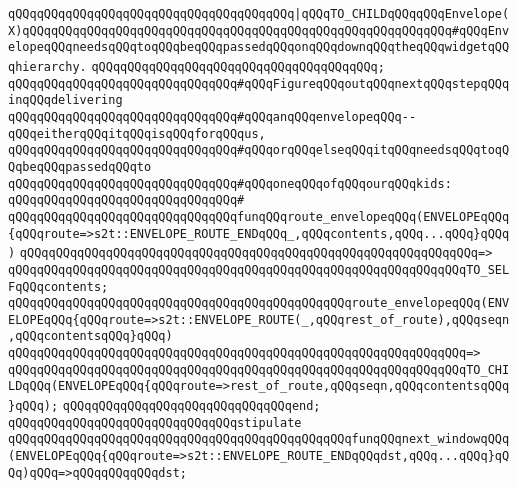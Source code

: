 \verb|qQQqqQQqqQQqqQQqqQQqqQQqqQQqqQQqqQQqqQQq|\verb#|qQQqTO_CHILDqQQqqQQqEnvelope(X)qQQqqQQqqQQqqQQqqQQqqQQqqQQqqQQqqQQqqQQqqQQqqQQqqQQqqQQqqQQq#\verb|#qQQqEnvelopeqQQqneedsqQQqtoqQQqbeqQQqpassedqQQqonqQQqdownqQQqtheqQQqwidgetqQQqhierarchy.|\newline
\verb|qQQqqQQqqQQqqQQqqQQqqQQqqQQqqQQqqQQqqQQq;|\newline
\newline
\verb|qQQqqQQqqQQqqQQqqQQqqQQqqQQqqQQq#qQQqFigureqQQqoutqQQqnextqQQqstepqQQqinqQQqdelivering|\newline
\verb|qQQqqQQqqQQqqQQqqQQqqQQqqQQqqQQq#qQQqanqQQqenvelopeqQQq--qQQqeitherqQQqitqQQqisqQQqforqQQqus,|\newline
\verb|qQQqqQQqqQQqqQQqqQQqqQQqqQQqqQQq#qQQqorqQQqelseqQQqitqQQqneedsqQQqtoqQQqbeqQQqpassedqQQqto|\newline
\verb|qQQqqQQqqQQqqQQqqQQqqQQqqQQqqQQq#qQQqoneqQQqofqQQqourqQQqkids:|\newline
\verb|qQQqqQQqqQQqqQQqqQQqqQQqqQQqqQQq#|\newline
\verb|qQQqqQQqqQQqqQQqqQQqqQQqqQQqqQQqfunqQQqroute_envelopeqQQq(ENVELOPEqQQq{qQQqroute=>s2t::ENVELOPE_ROUTE_ENDqQQq_,qQQqcontents,qQQq...qQQq}qQQq)|\newline
\verb|qQQqqQQqqQQqqQQqqQQqqQQqqQQqqQQqqQQqqQQqqQQqqQQqqQQqqQQqqQQqqQQq=>|\newline
\verb|qQQqqQQqqQQqqQQqqQQqqQQqqQQqqQQqqQQqqQQqqQQqqQQqqQQqqQQqqQQqqQQqTO_SELFqQQqcontents;|\newline
\newline
\verb|qQQqqQQqqQQqqQQqqQQqqQQqqQQqqQQqqQQqqQQqqQQqqQQqroute_envelopeqQQq(ENVELOPEqQQq{qQQqroute=>s2t::ENVELOPE_ROUTE(_,qQQqrest_of_route),qQQqseqn,qQQqcontentsqQQq}qQQq)|\newline
\verb|qQQqqQQqqQQqqQQqqQQqqQQqqQQqqQQqqQQqqQQqqQQqqQQqqQQqqQQqqQQqqQQq=>|\newline
\verb|qQQqqQQqqQQqqQQqqQQqqQQqqQQqqQQqqQQqqQQqqQQqqQQqqQQqqQQqqQQqqQQqTO_CHILDqQQq(ENVELOPEqQQq{qQQqroute=>rest_of_route,qQQqseqn,qQQqcontentsqQQq}qQQq);|\newline
\verb|qQQqqQQqqQQqqQQqqQQqqQQqqQQqqQQqend;|\newline
\newline
\newline
\verb|qQQqqQQqqQQqqQQqqQQqqQQqqQQqqQQqstipulate|\newline
\newline
\verb|qQQqqQQqqQQqqQQqqQQqqQQqqQQqqQQqqQQqqQQqqQQqqQQqfunqQQqnext_windowqQQq(ENVELOPEqQQq{qQQqroute=>s2t::ENVELOPE_ROUTE_ENDqQQqdst,qQQq...qQQq}qQQq)qQQq=>qQQqqQQqqQQqdst;|\newline
